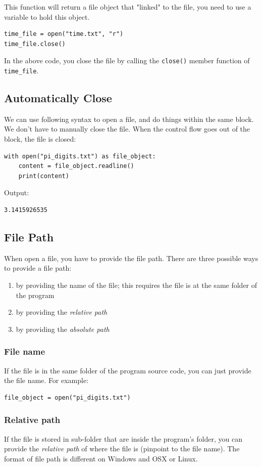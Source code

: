 \documentclass[12pt]{book}
\begin{document}
This function will return a file object that "linked" to the file, you need to use a variable to hold this object.
\begin{verbatim}
time_file = open("time.txt", "r")
time_file.close()
\end{verbatim}
In the above code, you close the file by calling the \texttt{close()} member function of \texttt{time\_file}.
\subsection{Automatically Close}
\label{sec:orge1da7d7}
We can use following syntax to open a file, and do things within the same block. We don't have to manually close the file. When the control flow goes out of the block, the file is closed:
\begin{verbatim}
with open("pi_digits.txt") as file_object:
    content = file_object.readline()
    print(content)
\end{verbatim}
Output:
\begin{verbatim}
3.1415926535
\end{verbatim}
\subsection{File Path}
\label{sec:orgb64cd8c}
When open a file, you have to provide the file path. There are three possible ways to provide a file path:
\begin{enumerate}
\item by providing the name of the file; this requires the file is at the same folder of the program
\item by providing the \emph{relative path}
\item by providing the \emph{absolute path}
\end{enumerate}
\subsubsection{File name}
\label{sec:org97917d9}
If the file is in the same folder of the program source code, you can just provide the file name. For example:
\begin{verbatim}
file_object = open("pi_digits.txt")
\end{verbatim}
\subsubsection{Relative path}
\label{sec:org6aa8cf3}
If the file is stored in sub-folder that are inside the program's folder, you can provide the \emph{relative path} of where the file is (pinpoint to the file name). The format of file path is different on Windows and OSX or Linux.
\end{document}
